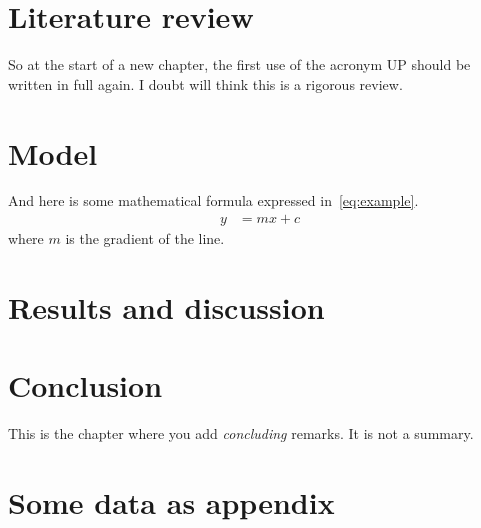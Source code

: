 \documentclass[a4paper,11pt,fleqn]{report}
\begin{document}
\chapter{Literature review}
\acresetall
So at the start of a new chapter, the first use of the acronym \ac{UP} should be written in full again.
I doubt \citet{ar:Manson2006} will think this is a rigorous review.


\chapter{Model}
\acresetall
And here is some mathematical formula expressed in~\eqref{eq:example}.
\begin{align}
y & = mx + c \label{eq:example}
\end{align}
where $m$ is the gradient of the line.

\chapter{Results and discussion}
\acresetall

\chapter{Conclusion}
\acresetall
This is the chapter where you add \emph{concluding} remarks. It is not a summary.





\appendix
\chapter{Some data as appendix}
\end{document}
